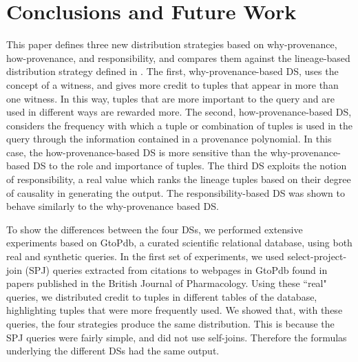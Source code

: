\section{Conclusions and Future Work}
\label{section:conclusions}

This paper 
defines three new distribution strategies based on why-provenance, how-provenance, and responsibility, and compares them against the lineage-based distribution strategy defined in \cite{dosso2020data}. 
The first, why-provenance-based DS, uses the concept of a witness, and gives more credit to tuples that appear in more than one witness. 
In this way, tuples that are more important to the query and are used in different ways are rewarded more. %
The second, how-provenance-based DS, considers the frequency with which a tuple or combination of tuples is used in the query through the information contained in a provenance polynomial. In this case, the how-provenance-based DS is more sensitive than the why-provenance-based DS to the role and importance of tuples.
The third DS exploits the notion of responsibility, a real value which ranks the lineage tuples based on their degree of causality in generating the output. The responsibility-based DS was shown to behave similarly to the why-provenance based DS.

To show the differences between the four DSs, we performed extensive experiments based on GtoPdb, a curated scientific relational database, using both real and synthetic queries. 
In the first set of experiments, we used select-project-join (SPJ) queries extracted from citations to webpages in GtoPdb found in papers published in the British Journal of Pharmacology. 
Using these ``real" queries, we distributed credit to tuples in different tables of the database, highlighting tuples that were more frequently used. 
We showed that, with these queries, the four strategies produce the same distribution. This is because the SPJ queries were fairly simple, and did not use self-joins. Therefore the formulas underlying the different DSs had the same output.

